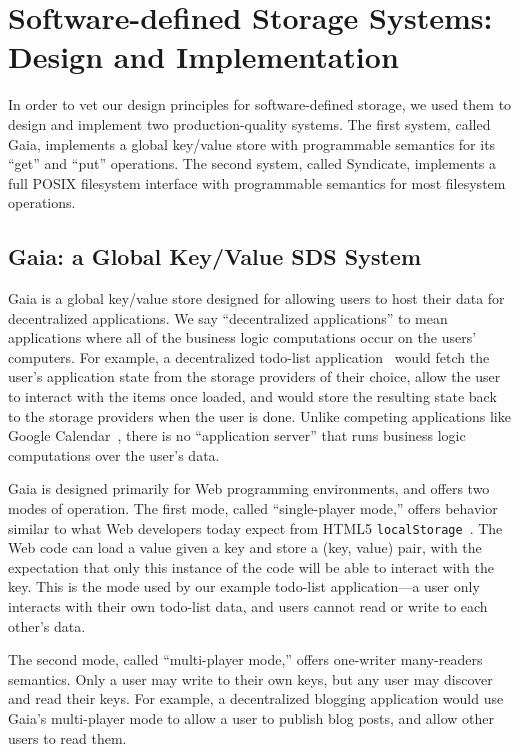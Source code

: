 \chapter{Software-defined Storage Systems: Design and Implementation}
\label{chap:syndicate_sds}

In order to vet our design principles for software-defined storage, we used them
to design and implement two production-quality systems.  The first system,
called Gaia, implements a global key/value store with programmable semantics for its
``get'' and ``put'' operations.  The second system, called Syndicate, implements
a full POSIX filesystem interface with programmable semantics for most
filesystem operations.

\section{Gaia: a Global Key/Value SDS System}

Gaia is a global key/value store designed for allowing users to host their data
for decentralized applications.  We say ``decentralized applications'' to mean
applications where all of the business logic computations occur on the
users' computers.  For example, a decentralized todo-list
application~\cite{blockstack-todo} would fetch the user's application state from
the storage providers of their choice, allow the user to interact with the items
once loaded, and would store the resulting state back to the storage providers
when the user is done.  Unlike competing applications like Google
Calendar~\cite{google-calendar}, there is no ``application server'' that
runs business logic computations over the user's data.

Gaia is designed primarily for Web programming environments, and offers two
modes of operation.  The first mode, called ``single-player mode,'' offers
behavior similar to what Web developers today expect from HTML5
\texttt{localStorage}~\cite{w3c-localstorage}.  The Web code can load a value
given a key and store a (key, value) pair, with the expectation that only this
instance of the code will be able to interact with the key.  This is the mode
used by our example todo-list application---a user only interacts with their own
todo-list data, and users cannot read or write to each other's data.

The second mode, called ``multi-player mode,'' offers one-writer many-readers
semantics.  Only a user may write to their own keys, but any user may discover
and read their keys.  For example, a decentralized blogging application would
use Gaia's multi-player mode to allow a user to publish blog posts, and allow
other users to read them.

